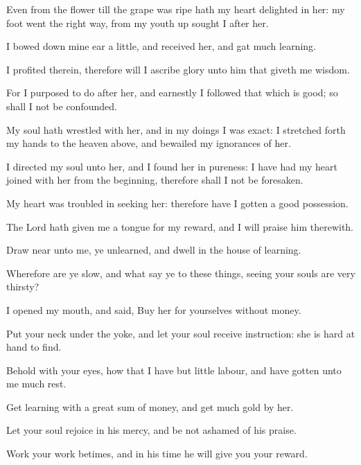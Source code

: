 {\par }{\PP {}Even from the flower till the grape was ripe hath my heart delighted in her: my foot went the right way, from my youth up sought I after her.
\par }{\PP {}I bowed down mine ear a little, and received her, and gat much learning.
\par }{\PP {}I profited therein, therefore will I ascribe glory unto him that giveth me wisdom.
\par }{\PP {}For I purposed to do after her, and earnestly I followed that which is good; so shall I not be confounded.
\par }{\PP {}My soul hath wrestled with her, and in my doings I was exact: I stretched forth my hands to the heaven above, and bewailed my ignorances of her.
\par }{\PP {}I directed my soul unto her, and I found her in pureness: I have had my heart joined with her from the beginning, therefore shall I not be foresaken.
\par }{\PP {}My heart was troubled in seeking her: therefore have I gotten a good possession.
\par }{\PP {}The Lord hath given me a tongue for my reward, and I will praise him therewith.
\par }{\PP {}Draw near unto me, ye unlearned, and dwell in the house of learning.
\par }{\PP {}Wherefore are ye slow, and what say ye to these things, seeing your souls are very thirsty?
\par }{\PP {}I opened my mouth, and said, Buy her for yourselves without money.
\par }{\PP {}Put your neck under the yoke, and let your soul receive instruction: she is hard at hand to find.
\par }{\PP {}Behold with your eyes, how that I have but little labour, and have gotten unto me much rest.
\par }{\PP {}Get learning with a great sum of money, and get much gold by her.
\par }{\PP {}Let your soul rejoice in his mercy, and be not ashamed of his praise.
\par }{\PP {}Work your work betimes, and in his time he will give you your reward.
\par }